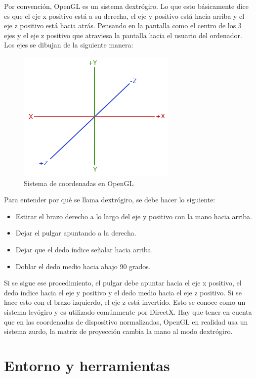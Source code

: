 \documentclass[a4paper, 17pt]{book}
\begin{document}
Por convención, OpenGL es un sistema dextrógiro. Lo que esto básicamente dice es que el eje x positivo está a su derecha, el eje y
positivo está hacia arriba y el eje z positivo está hacia atrás. Pensando en la pantalla como el centro de los 3 ejes y el eje z positivo
que atraviesa la pantalla hacia el usuario del ordenador. Los ejes se dibujan de la siguiente manera:

\begin{figure}[hbt!]
    \centering
    \includegraphics[scale=0.40, keepaspectratio]{img/coordinate_systems_right_handed.png}
    \caption{Sistema de coordenadas en OpenGL}
    \label{figura:khronos}
\end{figure}

Para entender por qué se llama dextrógiro, se debe hacer lo siguiente:

\begin{itemize}
  \item Estirar el brazo derecho a lo largo del eje y positivo con la mano hacia arriba.
  \item Dejar el pulgar apuntando a la derecha.
  \item Dejar que el dedo índice señalar hacia arriba.
  \item Doblar el dedo medio hacia abajo 90 grados.
\end{itemize}

Si se sigue ese procedimiento, el pulgar debe apuntar hacia el eje x positivo, el dedo índice hacia 
el eje y positivo y el dedo medio hacia el eje z positivo. Si se hace esto con el brazo izquierdo,
el eje z está invertido. Esto se conoce como un sistema levógiro y es utilizado comúnmente por DirectX.
Hay que tener en cuenta que en las coordenadas de dispositivo normalizadas, OpenGL en realidad usa un
sistema zurdo, la matriz de proyección cambia la mano al modo dextrógiro.

\section{Entorno y herramientas} 
\label{sec:Entorno}
\end{document}
